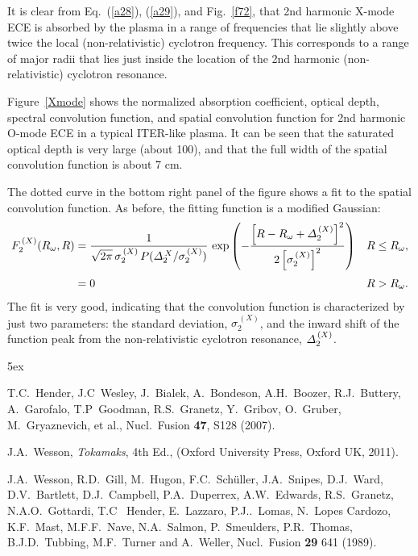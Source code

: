 \documentclass{iopjournal}
\begin{document}
{ It is clear from Eq.~(\ref{a28}),
(\ref{a29}), and Fig.~\ref{f72}, that 2nd harmonic X-mode  ECE is absorbed by the plasma in a range of frequencies that lie slightly above twice the local (non-relativistic) cyclotron frequency. This corresponds to a range of major radii that lies just inside the location of the 2nd harmonic (non-relativistic) cyclotron resonance. 

Figure~\ref{Xmode} shows the normalized absorption coefficient, optical depth, spectral convolution function, and spatial convolution function for
2nd harmonic O-mode ECE in a typical ITER-like plasma. It can be seen that the saturated optical depth is very  large (about 100), and that the full 
width of the spatial convolution function is about 7 cm.

  The dotted curve in the bottom right panel of the figure shows a fit to the
spatial convolution function. As before, the fitting function is a modified Gaussian:
\begin{align}
F_2^{\,(X)}(R_\omega,R)&= \frac{1}{\sqrt{2\pi}\,\sigma_2^{\,(X)} \,P({\mit\Delta}_2^{\,X}/\sigma_2^{\,(X)})}\,
\exp\left(-\frac{\left[R-R_\omega+{\mit\Delta}_2^{\,(X)}\right]^2}{2\left[\sigma_2^{\,(X)}\right]^2}\right)&R\leq R_\omega,\\[0.5ex]
&= 0& R>R_\omega.
\end{align}
  The fit is very good, indicating that the convolution function 
is characterized by just two parameters: the standard deviation, $\sigma_2^{\,(X)}$, and the inward shift
of the function peak from the non-relativistic cyclotron resonance, ${\mit\Delta}_2^{\,(X)}$. 

\begin{thebibliography}{99}\baselineskip 5ex

 T.C.~Hender, J.C~Wesley, J.~Bialek, A.~Bondeson, A.H.~Boozer, R.J.~Buttery, A.~Garofalo, T.P~Goodman, R.S.~Granetz, Y.~Gribov, O.~Gruber, 
M.~Gryaznevich, et al., Nucl.\  Fusion {\bf 47}, S128 (2007).

 J.A.~Wesson, {\em Tokamaks}, 4th Ed., (Oxford University Press, Oxford UK, 2011).

 J.A.~Wesson, R.D.~Gill, M.~Hugon, F.C.~Sch\"{u}ller, J.A.~Snipes, D.J.~Ward, D.V.~Bartlett, D.J.~Campbell, P.A.~Duperrex, A.W.~Edwards, 
R.S.~Granetz, N.A.O.~Gottardi, T.C~ Hender, E.~Lazzaro, P.J..~Lomas, N.~Lopes Cardozo, K.F.~Mast, M.F.F.~Nave, N.A.~Salmon, P.~Smeulders, 
P.R.~Thomas, B.J.D.~Tubbing, M.F.~Turner and A.~Weller, Nucl.\ Fusion {\bf 29} 641 (1989). 


\end{thebibliography}}
\end{document}
